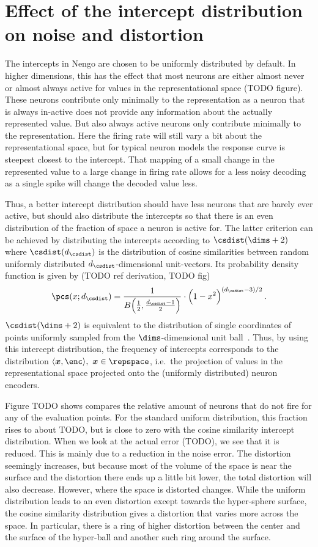 \section{Effect of the intercept distribution on noise and distortion}
The intercepts in Nengo are chosen to be uniformly distributed by default.
In higher dimensions, this has the effect that most neurons are either almost never or almost always active for values in the representational space (TODO figure).
These neurons contribute only minimally to the representation as a neuron that is always in-active does not provide any information about the actually represented value.
But also always active neurons only contribute minimally to the representation.
Here the firing rate will still vary a bit about the representational space, but for typical neuron models the response curve is steepest closest to the intercept.
That mapping of a small change in the represented value to a large change in firing rate allows for a less noisy decoding as a single spike will change the decoded value less.

Thus, a better intercept distribution should have less neurons that are barely ever active, but should also distribute the intercepts so that there is an even distribution of the fraction of space a neuron is active for.
The latter criterion can be achieved by distributing the intercepts according to $\csdist(\dims+2)$ where $\csdist(d_{\csdist})$ is the distribution of cosine similarities between random uniformly distributed $d_{\csdist}$-dimensional unit-vectors.
Its probability density function is given by (TODO ref derivation, TODO fig)
\begin{equation}
\pcs(x; d_{\csdist}) = \frac{1}{B\!\del{\frac{1}{2}, \frac{d_{\csdist} - 1}{2}}} \cdot \del{1 - x^2}^{\del{d_{\csdist} - 3} / 2} \text{.}\label{eqn:pcs}
\end{equation}
$\csdist(\dims+2)$ is equivalent to the distribution of single coordinates of points uniformly sampled from the $\dims$-dimensional unit ball~\parencite{voelker2017}.
Thus, by using this intercept distribution, the frequency of intercepts corresponds to the distribution $\langle \vc x, \enc \rangle,\ \vc x \in \repspace$, i.e.\ the projection of values in the representational space projected onto the (uniformly distributed) neuron encoders.

Figure TODO shows compares the relative amount of neurons that do not fire for any of the evaluation points.
For the standard uniform distribution, this fraction rises to about TODO, but is close to zero with the cosine similarity intercept distribution.
When we look at the actual error (TODO), we see that it is reduced.
This is mainly due to a reduction in the noise error.
The distortion seemingly increases, but because most of the volume of the space is near the surface and the distortion there ends up a little bit lower, the total distortion will also decrease.
However, where the space is distorted changes.
While the uniform distribution leads to an even distortion except towards the hyper-sphere surface, the cosine similarity distribution gives a distortion that varies more across the space.
In particular, there is a ring of higher distortion between the center and the surface of the hyper-ball and another such ring around the surface.

